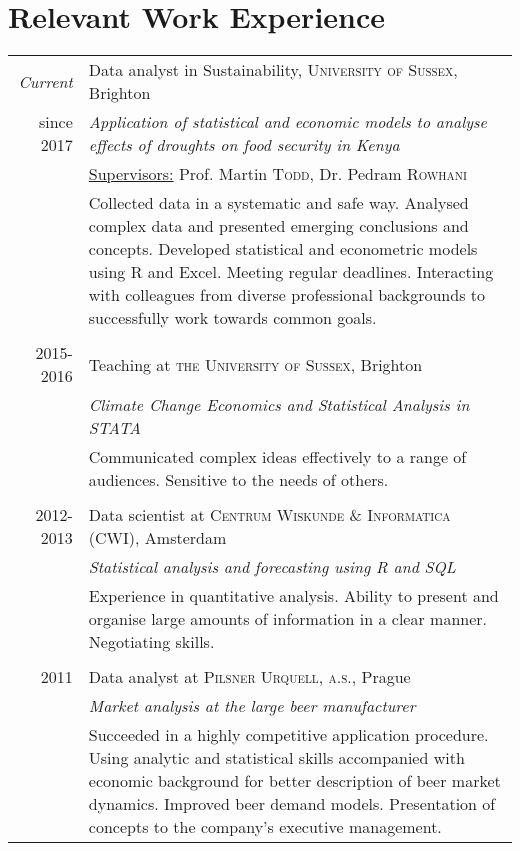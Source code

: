 \documentclass[a4paper,10pt]{article}
\begin{document}
\section{Relevant Work Experience}
\begin{tabular}{r|p{11cm}}
 \emph{Current} & Data analyst in Sustainability, \textsc{University of Sussex}, Brighton \\since \textsc{2017}&\emph{Application of statistical and economic models to analyse effects of droughts on food security in Kenya}\\
& \underline{Supervisors:} Prof. Martin \textsc{Todd}, Dr. Pedram \textsc{Rowhani}\\
 &\footnotesize{Collected data in a systematic and safe way. Analysed complex data and presented emerging conclusions and concepts. Developed statistical and econometric models using R and Excel.  Meeting regular deadlines. Interacting with colleagues from diverse professional backgrounds to successfully work towards common goals.}
 
 
 \\\multicolumn{2}{c}{} \\
 \textsc{2015-2016} & Teaching at \textsc{the University of Sussex}, Brighton \\&\emph{Climate Change Economics and Statistical Analysis in STATA}\\&\footnotesize{Communicated complex ideas effectively to a range of audiences. Sensitive to the needs of others.}\\\multicolumn{2}{c}{} \\
 
 \textsc{2012-2013} & Data scientist at \textsc{Centrum Wiskunde \& Informatica (CWI)}, Amsterdam\\ &\emph{Statistical analysis and forecasting using R and SQL}\\&\footnotesize{Experience in quantitative analysis. Ability to present and organise large amounts of information in a clear manner. Negotiating skills.}\\\multicolumn{2}{c}{} \\

\textsc{2011} & Data analyst at \textsc{Pilsner Urquell, a.s.}, Prague\\ &\emph{Market analysis at the large beer manufacturer}\\&\footnotesize{Succeeded in a highly competitive application procedure. Using analytic and statistical skills accompanied with economic background for better description of beer market dynamics. Improved beer demand models. Presentation of concepts to the company's executive management.}
\end{tabular}
\end{document}
